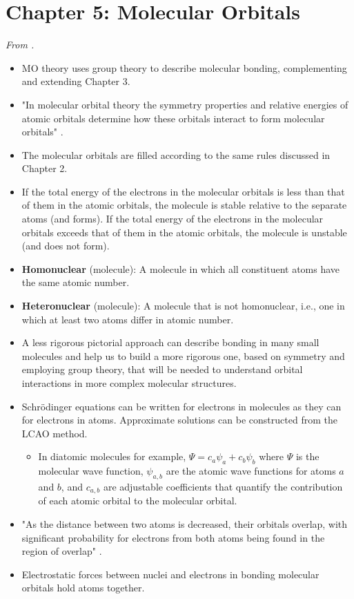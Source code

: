 \documentclass[../notes.tex]{subfiles}
\begin{document}
\section{Chapter 5: Molecular Orbitals}
\emph{From \textcite{bib:MiesslerFischerTarr}.}
\begin{itemize}
    \item {}MO theory uses group theory to describe molecular bonding, complementing and extending Chapter 3.
    \item "In molecular orbital theory the symmetry properties and relative energies of atomic orbitals determine how these orbitals interact to form molecular orbitals" \parencite[117]{bib:MiesslerFischerTarr}.
    \item The molecular orbitals are filled according to the same rules discussed in Chapter 2.
    \item If the total energy of the electrons in the molecular orbitals is less than that of them in the atomic orbitals, the molecule is stable relative to the separate atoms (and forms). If the total energy of the electrons in the molecular orbitals exceeds that of them in the atomic orbitals, the molecule is unstable (and does not form).
    \item \textbf{Homonuclear} (molecule): A molecule in which all constituent atoms have the same atomic number.
    \item \textbf{Heteronuclear} (molecule): A molecule that is not homonuclear, i.e., one in which at least two atoms differ in atomic number.
    \item A less rigorous pictorial approach can describe bonding in many small molecules and help us to build a more rigorous one, based on symmetry and employing group theory, that will be needed to understand orbital interactions in more complex molecular structures.
    \item Schr\"{o}dinger equations can be written for electrons in molecules as they can for electrons in atoms. Approximate solutions can be constructed from the LCAO method.
    \begin{itemize}
        \item In diatomic molecules for example, $\Psi=c_a\psi_a+c_b\psi_b$ where $\Psi$ is the molecular wave function, $\psi_{a,b}$ are the atomic wave functions for atoms $a$ and $b$, and $c_{a,b}$ are adjustable coefficients that quantify the contribution of each atomic orbital to the molecular orbital.
    \end{itemize}
    \item "As the distance between two atoms is decreased, their orbitals overlap, with significant probability for electrons from both atoms being found in the region of overlap" \parencite[117]{bib:MiesslerFischerTarr}.
    \item Electrostatic forces between nuclei and electrons in bonding molecular orbitals hold atoms together.
\end{itemize}
\end{document}
